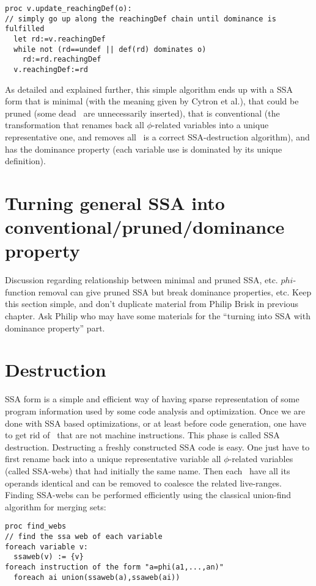 \begin{verbatim}
proc v.update_reachingDef(o):
// simply go up along the reachingDef chain until dominance is fulfilled 
  let rd:=v.reachingDef
  while not (rd==undef || def(rd) dominates o)
    rd:=rd.reachingDef
  v.reachingDef:=rd
\end{verbatim}

As detailed and explained further, this simple algorithm ends up with a SSA form that is minimal (with the meaning given by Cytron et al.), that could be pruned (some dead \phiops\ are unnecessarily inserted), that is conventional (the transformation that renames back all $\phi$-related variables into a unique representative one, and removes all \phiops\ is a correct SSA-destruction algorithm), and has the dominance property (each variable use is dominated by its unique definition).

\section{Turning general SSA into conventional/pruned/dominance property}

Discussion regarding relationship between minimal and pruned SSA, etc.
$phi$-function removal can give pruned SSA but break
dominance properties, etc. Keep this section simple, and don't duplicate
material from Philip Brisk in previous chapter.
Ask Philip who may have some materials for the ``turning into SSA with dominance property'' part.


\section{Destruction }
\label{sec:classical_destruction}

SSA form is a simple and efficient way of having sparse representation of some program information used by some code analysis and optimization. Once we are done with SSA based optimizations, or at least before code generation, one have to get rid of \phiops\ that are not machine instructions. This phase is called SSA destruction. 
Destructing a freshly constructed SSA code is easy. One just have to first rename back into a unique representative variable all $\phi$-related variables (called SSA-webs) that had initially the same name. Then each \phiop\ have all its operands identical and can be removed to coalesce the related live-ranges.
Finding SSA-webs can be performed efficiently using the classical union-find algorithm for merging sets:
\begin{verbatim}
proc find_webs
// find the ssa web of each variable
foreach variable v:
  ssaweb(v) := {v}
foreach instruction of the form "a=phi(a1,...,an)"
  foreach ai union(ssaweb(a),ssaweb(ai))
\end{verbatim}

